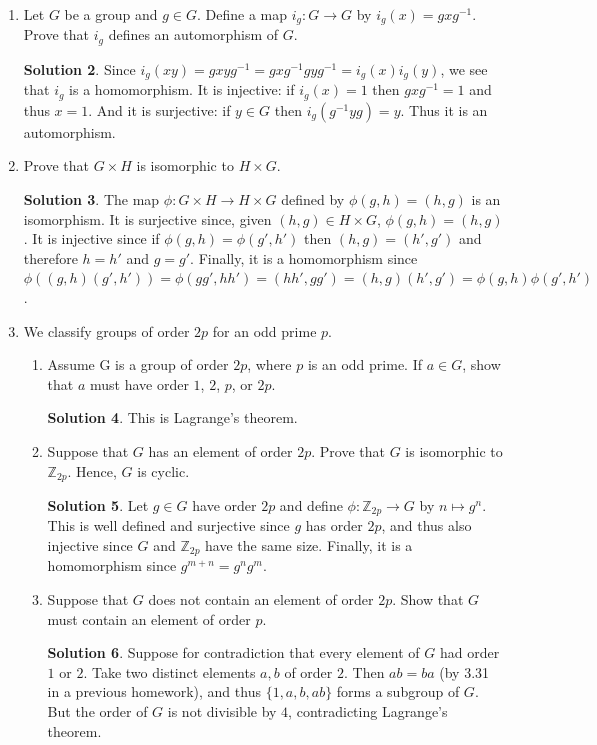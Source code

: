 \documentclass{article}
\newcommand{\ZZ}{\mathbb{Z}}
\theoremstyle{definition}
\newtheorem*{solution}{Solution}
\begin{document}
\begin{enumerate}
\begin{solution}
\end{solution}
\item[9.41.] Let $G$ be a group and $g \in G$. Define a map $i_g : G \to G$ by $i_g(x) = gxg^{-1}$. Prove that $i_g$ defines an automorphism of $G$.
\begin{solution}
Since $i_g(xy) = gxyg^{-1} = gxg^{-1}gyg^{-1} = i_g(x)i_g(y)$, we see that $i_g$ is a homomorphism.  It is injective: if $i_g(x) = 1$ then $gxg^{-1} = 1$ and thus $x = 1$.  And it is surjective: if $y \in G$ then $i_g(g^{-1}yg) = y$.  Thus it is an automorphism.
\end{solution}
\item[9.48] Prove that $G \times H$ is isomorphic to $H \times G$.
\begin{solution}
The map $\phi : G\times H \to H \times G$ defined by $\phi(g,h) = (h,g)$ is an isomorphism.  It is surjective since, given $(h,g) \in H \times G$, $\phi(g,h) = (h,g)$.  It is injective since if $\phi(g,h) = \phi(g',h')$ then $(h,g) = (h',g')$ and therefore $h = h'$ and $g = g'$.  Finally, it is a homomorphism since $\phi((g,h)(g',h')) = \phi(gg',hh') = (hh',gg') = (h,g)(h',g') = \phi(g,h)\phi(g',h')$.
\end{solution}
\item[9.55] We classify groups of order $2p$ for an odd prime $p$.
\begin{enumerate}
\item Assume G is a group of order $2p$, where $p$ is an odd prime.  If $a \in G$, show that $a$ must have order $1$, $2$, $p$, or $2p$.
\begin{solution}
This is Lagrange's theorem.
\end{solution}
\item Suppose that $G$ has an element of order $2p$. Prove that $G$ is isomorphic to $\ZZ_{2p}$. Hence, $G$ is cyclic.
\begin{solution}
Let $g \in G$ have order $2p$ and define $\phi : \ZZ_{2p} \to G$ by $n \mapsto g^n$.  This is well defined and surjective since $g$ has order $2p$, and thus also injective since $G$ and $\ZZ_{2p}$ have the same size.  Finally, it is a homomorphism since $g^{m+n} = g^ng^m$.
\end{solution}
\item Suppose that $G$ does not contain an element of order $2p$. Show that $G$ must contain an element of order $p$.
\begin{solution}
Suppose for contradiction that every element of $G$ had order $1$ or $2$.  Take two distinct elements $a,b$ of order $2$.  Then $ab = ba$ (by 3.31 in a previous homework), and thus $\{1, a, b, ab\}$ forms a subgroup of $G$.  But the order of $G$ is not divisible by $4$, contradicting Lagrange's theorem.

\end{solution}
\end{enumerate}
\end{enumerate}
\end{document}

